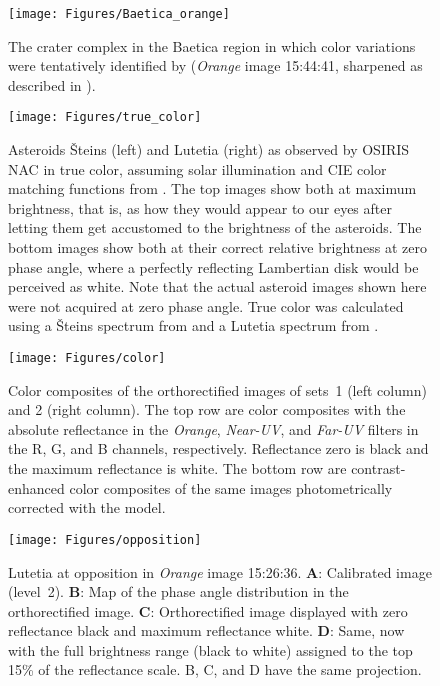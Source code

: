 \documentclass[3p,authoryear]{elsarticle}
\begin{document}
\newpage
\clearpage

\begin{figure}
\centering
\texttt{[image: Figures/Baetica\_orange]}
\caption{The crater complex in the Baetica region in which color variations were tentatively identified by \citet{Mg12} ({\it Orange} image 15:44:41, sharpened as described in \citealt{S10}).}
\label{fig:Baetica_Orange}
\end{figure}

\newpage
\clearpage

\begin{figure}
\centering
\texttt{[image: Figures/true\_color]}
\caption{Asteroids {\v S}teins (left) and Lutetia (right) as observed by OSIRIS NAC in true color, assuming solar illumination and CIE color matching functions from \citet{V78}. The top images show both at maximum brightness, that is, as how they would appear to our eyes after letting them get accustomed to the brightness of the asteroids. The bottom images show both at their correct relative brightness at zero phase angle, where a perfectly reflecting Lambertian disk would be perceived as white. Note that the actual asteroid images shown here were not acquired at zero phase angle. True color was calculated using a {\v S}teins spectrum from \citet{F08} and a Lutetia spectrum from \citet{P10}.}
\label{fig:true_color}
\end{figure}

\newpage
\clearpage

\begin{figure}
\centering
\texttt{[image: Figures/color]}
\caption{Color composites of the orthorectified images of sets~1 (left column) and 2 (right column). The top row are color composites with the absolute reflectance in the {\it Orange}, {\it Near-UV}, and {\it Far-UV} filters in the R, G, and B channels, respectively. Reflectance zero is black and the maximum reflectance is white. The bottom row are contrast-enhanced color composites of the same images photometrically corrected with the \citet{H02} model.}
\label{fig:color}
\end{figure}

\newpage
\clearpage

\begin{figure}
\centering
\texttt{[image: Figures/opposition]}
\caption{Lutetia at opposition in {\it Orange} image 15:26:36. {\bf A}: Calibrated image (level~2). {\bf B}: Map of the phase angle distribution in the orthorectified image. {\bf C}: Orthorectified image displayed with zero reflectance black and maximum reflectance white. {\bf D}: Same, now with the full brightness range (black to white) assigned to the top 15\% of the reflectance scale. B, C, and D have the same projection.}
\label{fig:opposition}
\end{figure}
\end{document}
